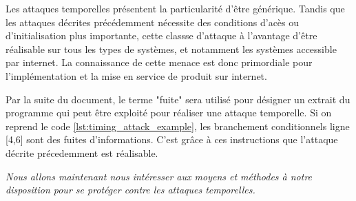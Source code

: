 Les attaques temporelles présentent la particularité d'être générique. Tandis que les attaques décrites précédemment nécessite des conditions d'acès ou d'initialisation plus importante, cette classse d'attaque à l'avantage d'être réalisable sur tous les types de systèmes, et notamment les systèmes accessible par internet. La connaissance de cette menace est donc primordiale pour l'implémentation et la mise en service de produit sur internet.\medbreak

Par la suite du document, le terme "fuite" sera utilisé pour désigner un extrait du programme qui peut être exploité pour réaliser une attaque temporelle. Si on reprend le code \ref{lst:timing_attack_example}, les branchement conditionnels ligne [4,6] sont des fuites d'informations. C'est grâce à ces instructions que l'attaque décrite précedemment est réalisable.\medbreak

\textit{Nous allons maintenant nous intéresser aux moyens et méthodes à notre disposition pour se protéger contre les attaques temporelles.}